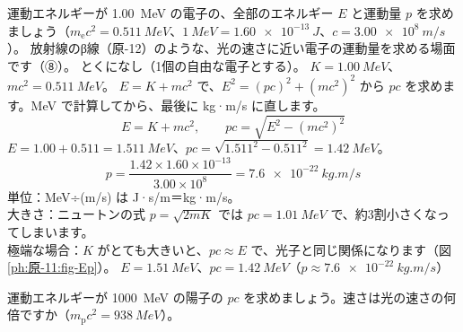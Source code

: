 \label{ph:原-11:ex9}
\begin{phreidai}[速い電子の運動量]
運動エネルギーが \qty{1.00}{MeV} の電子の、全部のエネルギー $E$ と運動量 $p$ を求めましょう（$m_{\mathrm e}c^2=\qty{0.511}{MeV}$、$\qty{1}{MeV}=\qty{1.60e-13}{J}$、$c=\qty{3.00e8}{m/s}$）。
\phbamen
放射線のβ線（原-12）のような、光の速さに近い電子の運動量を求める場面です（⑧）。
\phmushi
とくになし（1個の自由な電子とする）。
\phzu
$K=\qty{1.00}{MeV}$、$mc^2=\qty{0.511}{MeV}$。
\phriyu
$E=K+mc^2$ で、$E^2=(pc)^2+(mc^2)^2$ から $pc$ を求めます。MeV で計算してから、最後に kg·m/s に直します。
\phtateru
\[ E=K+mc^2,\qquad pc=\sqrt{E^2-(mc^2)^2} \]
\phtoku
$E=1.00+0.511=\qty{1.511}{MeV}$、$pc=\sqrt{1.511^2-0.511^2}=\qty{1.42}{MeV}$。
\[ p=\frac{1.42\times1.60\times10^{-13}}{3.00\times10^8}=\qty{7.6e-22}{kg.m/s} \]
\phtashikame
単位：MeV÷(m/s) は J·s/m＝kg·m/s。\\
大きさ：ニュートンの式 $p=\sqrt{2mK}$ では $pc=\qty{1.01}{MeV}$ で、約3割小さくなってしまいます。\\
極端な場合：$K$ がとても大きいと、$pc\approx E$ で、光子と同じ関係になります（図\ref{ph:原-11:fig-Ep}）。
\kotae $E=\qty{1.51}{MeV}$、$pc=\qty{1.42}{MeV}$（$p\approx\qty{7.6e-22}{kg.m/s}$）
\end{phreidai}
\begin{jibun}
運動エネルギーが \qty{1000}{MeV} の陽子の $pc$ を求めましょう。速さは光の速さの何倍ですか（$m_{\mathrm p}c^2=\qty{938}{MeV}$）。
\end{jibun}

